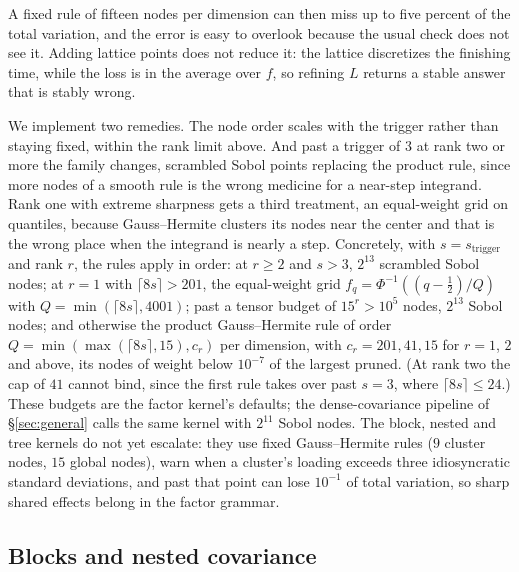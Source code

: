 \documentclass[11pt]{article}
\begin{document}
A fixed rule of fifteen nodes per dimension can then miss up to five
percent of the total variation, and the error is easy to overlook because
the usual check does not see it. Adding lattice points does not reduce
it: the lattice discretizes the finishing time, while the loss is in the
average over $f$, so refining $L$ returns a stable answer that is stably
wrong.

We implement two remedies. The node order scales with the trigger rather
than staying fixed, within the rank limit above. And past a trigger of
$3$ at rank two or more the
family changes, scrambled Sobol points replacing the product rule, since
more nodes of a smooth rule is the wrong medicine for a near-step
integrand. Rank one with extreme sharpness gets a third treatment, an
equal-weight grid on quantiles, because Gauss--Hermite clusters its nodes
near the center and that is the wrong place when the integrand is nearly
a step. Concretely, with $s=s_{\mathrm{trigger}}$ and rank $r$, the rules
apply in order: at $r\ge2$ and $s>3$, $2^{13}$ scrambled Sobol nodes; at
$r=1$ with $\lceil8s\rceil>201$, the equal-weight grid
$f_q=\Phi^{-1}((q-\tfrac12)/Q)$ with $Q=\min(\lceil8s\rceil,4001)$;
past a tensor budget of $15^r>10^5$ nodes, $2^{13}$ Sobol nodes; and
otherwise the product Gauss--Hermite rule of order
$Q=\min(\max(\lceil8s\rceil,15),c_r)$ per dimension, with
$c_r=201,41,15$ for $r=1$, $2$ and above, its nodes of weight below
$10^{-7}$ of the largest pruned. (At rank two the cap of $41$ cannot
bind, since the first rule takes over past $s=3$, where
$\lceil8s\rceil\le24$.) These budgets are the factor kernel's defaults;
the dense-covariance pipeline of \S\ref{sec:general} calls the same
kernel with $2^{11}$ Sobol nodes. The block, nested and tree kernels do
not yet escalate: they use fixed Gauss--Hermite rules ($9$ cluster
nodes, $15$ global nodes), warn when a cluster's loading exceeds three
idiosyncratic standard deviations, and past that point can lose
$10^{-1}$ of total variation, so sharp shared effects belong in
the factor grammar.


\subsection{Blocks and nested covariance}\label{sec:blocks}
\end{document}
